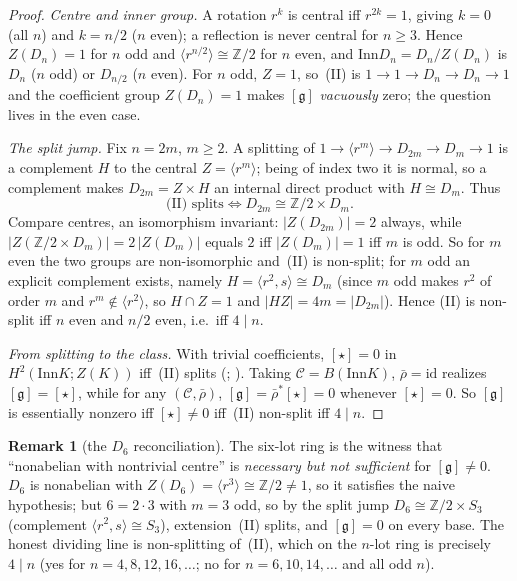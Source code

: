 \documentclass[11pt]{article}
\theoremstyle{definition}
\newtheorem{remark}[theorem]{Remark}
\newcommand{\C}{\mathcal{C}}
\newcommand{\id}{\mathrm{id}}
\newcommand{\Z}{\mathbb{Z}}
\newcommand{\Inn}{\mathrm{Inn}}
\newcommand{\gerbe}{\mathfrak{g}}
\newcommand{\gp}[1]{\langle #1\rangle}
\begin{document}
\begin{proof}
\emph{Centre and inner group.} A rotation $r^k$ is central iff $r^{2k}=1$, giving $k=0$ (all $n$)
and $k=n/2$ ($n$ even); a reflection is never central for $n\ge3$. Hence $Z(D_n)=1$ for $n$ odd
and $\gp{r^{n/2}}\cong\Z/2$ for $n$ even, and $\Inn D_n=D_n/Z(D_n)$ is $D_n$ ($n$ odd) or
$D_{n/2}$ ($n$ even). For $n$ odd, $Z=1$, so~(II) is $1\to1\to D_n\to D_n\to1$ and the coefficient
group $Z(D_n)=1$ makes $[\gerbe]$ \emph{vacuously} zero; the question lives in the even case.

\emph{The split jump.} Fix $n=2m$, $m\ge2$. A splitting of
$1\to\gp{r^m}\to D_{2m}\to D_m\to1$ is a complement $H$ to the central $Z=\gp{r^m}$; being of
index two it is normal, so a complement makes $D_{2m}=Z\times H$ an internal direct product with
$H\cong D_m$. Thus
\[
\text{(II) splits}\iff D_{2m}\cong\Z/2\times D_m.
\]
Compare centres, an isomorphism invariant: $|Z(D_{2m})|=2$ always, while
$|Z(\Z/2\times D_m)|=2\,|Z(D_m)|$ equals $2$ iff $|Z(D_m)|=1$ iff $m$ is odd. So for $m$ even the
two groups are non-isomorphic and~(II) is non-split; for $m$ odd an explicit complement exists,
namely $H=\gp{r^2,s}\cong D_m$ (since $m$ odd makes $r^2$ of order $m$ and $r^m\notin\gp{r^2}$, so
$H\cap Z=1$ and $|HZ|=4m=|D_{2m}|$). Hence (II) is non-split iff $n$ even and $n/2$ even, i.e.\
iff $4\mid n$.

\emph{From splitting to the class.} With trivial coefficients, $[\star]=0$ in
$H^2(\Inn K;Z(K))$ iff~(II) splits (\cite[IV.3]{brown}; \cite{eml}). Taking $\C=B(\Inn K)$,
$\bar\rho=\id$ realizes $[\gerbe]=[\star]$, while for any $(\C,\bar\rho)$,
$[\gerbe]=\bar\rho^*[\star]=0$ whenever $[\star]=0$. So $[\gerbe]$ is essentially nonzero iff
$[\star]\neq0$ iff~(II) non-split iff $4\mid n$.
\end{proof}

\begin{remark}[the $D_6$ reconciliation]\label{rem:d6}
The six-lot ring is the witness that ``nonabelian with nontrivial centre'' is \emph{necessary but
not sufficient} for $[\gerbe]\neq0$. $D_6$ is nonabelian with $Z(D_6)=\gp{r^3}\cong\Z/2\neq1$, so
it satisfies the naive hypothesis; but $6=2\cdot3$ with $m=3$ odd, so by the split jump
$D_6\cong\Z/2\times S_3$ (complement $\gp{r^2,s}\cong S_3$), extension~(II) splits, and
$[\gerbe]=0$ on every base. The honest dividing line is non-splitting of~(II), which on the
$n$-lot ring is precisely $4\mid n$ (yes for $n=4,8,12,16,\dots$; no for $n=6,10,14,\dots$ and all
odd $n$).
\end{remark}
\end{document}
